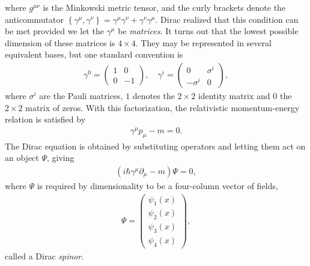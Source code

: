 \documentclass[twoside,english]{uiofysmaster}
\begin{document}
where $g^{\mu\nu}$ is the Minkowski metric tensor, and the curly brackets denote the anticommutator $\left\{ \gamma^\mu, \gamma^\nu \right\} = \gamma^\mu \gamma^\nu + \gamma^\nu \gamma^\mu$. Dirac realized that this condition can be met provided we let the $\gamma^\mu$ be {\it matrices}. It turns out that the lowest possible dimension of these matrices is $4\times 4$. They may be represented in several equivalent bases, but one standard convention is
\begin{align}
	\gamma^0 = \begin{pmatrix}
		1 & 0 \\ 0 & -1
	\end{pmatrix}, \quad{} \gamma^i = \begin{pmatrix}
		0 & \sigma^i \\ -\sigma^i & 0
	\end{pmatrix},
\end{align}
where $\sigma^i$ are the Pauli matrices, $1$ denotes the $2\times 2$ identity matrix and $0$ the $2\times 2$ matrix of zeros. With this factorization, the relativistic momentum-energy relation is satisfied by
\begin{align}
	\gamma^\mu p_\mu - m = 0.
\end{align}
The Dirac equation is obtained by substituting operators and letting them act on an object $\Psi$, giving
\begin{align}
	\left(i\hbar \gamma^\mu \partial_\mu - m\right)\Psi = 0,
\end{align}
where $\Psi$ is required by dimensionality to be a four-column vector of fields,
\begin{align}
	\Psi = \begin{pmatrix}
		\psi_1(x) \\ \psi_2(x) \\ \psi_3(x) \\ \psi_4(x)
	\end{pmatrix},
\end{align}
called a Dirac {\it spinor}.
\end{document}
